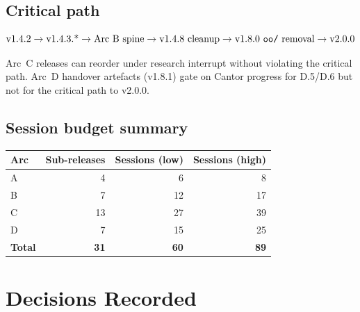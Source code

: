 \documentclass[11pt,a4paper]{article}
\begin{document}
\subsection{Critical path}

\[
\text{v1.4.2} \to \text{v1.4.3.*} \to \text{Arc B spine} \to \text{v1.4.8 cleanup} \to \text{v1.8.0 \texttt{oo/} removal} \to \text{v2.0.0}
\]

Arc~C releases can reorder under research interrupt without violating the critical path. Arc~D handover artefacts (v1.8.1) gate on Cantor progress for D.5/D.6 but not for the critical path to v2.0.0.

\subsection{Session budget summary}

\begin{table}[h]
\centering
\begin{tabular}{lrrr}
\toprule
\textbf{Arc} & \textbf{Sub-releases} & \textbf{Sessions (low)} & \textbf{Sessions (high)} \\
\midrule
A & 4 & 6 & 8 \\
B & 7 & 12 & 17 \\
C & 13 & 27 & 39 \\
D & 7 & 15 & 25 \\
\midrule
\textbf{Total} & \textbf{31}\footnotemark & \textbf{60} & \textbf{89} \\
\bottomrule
\end{tabular}
\end{table}


\section{Decisions Recorded}
\end{document}
